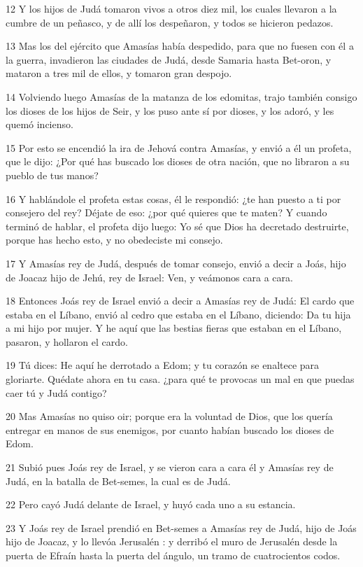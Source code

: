 \par 12 Y los hijos de Judá tomaron vivos a otros diez mil, los cuales llevaron a la cumbre de un peñasco, y de allí los despeñaron, y todos se hicieron pedazos.
\par 13 Mas los del ejército que Amasías había despedido, para que no fuesen con él a la guerra, invadieron las ciudades de Judá, desde Samaria hasta Bet-oron, y mataron a tres mil de ellos, y tomaron gran despojo.
\par 14 Volviendo luego Amasías de la matanza de los edomitas, trajo también consigo los dioses de los hijos de Seir, y los puso ante sí por dioses, y los adoró, y les quemó incienso.
\par 15 Por esto se encendió la ira de Jehová contra Amasías, y envió a él un profeta, que le dijo: ¿Por qué has buscado los dioses de otra nación, que no libraron a su pueblo de tus manos?
\par 16 Y hablándole el profeta estas cosas, él le respondió: ¿te han puesto a ti por consejero del rey? Déjate de eso: ¿por qué quieres que te maten? Y cuando terminó de hablar, el profeta dijo luego: Yo sé que Dios ha decretado destruirte, porque has hecho esto, y no obedeciste mi consejo.
\par 17 Y Amasías rey de Judá, después de tomar consejo, envió a decir a Joás, hijo de Joacaz hijo de Jehú, rey de Israel: Ven, y veámonos cara a cara.
\par 18 Entonces Joás rey de Israel envió a decir a Amasías rey de Judá: El cardo que estaba en el Líbano, envió al cedro que estaba en el Líbano, diciendo: Da tu hija a mi hijo por mujer. Y he aquí que las bestias fieras que estaban en el Líbano, pasaron, y hollaron el cardo.
\par 19 Tú dices: He aquí he derrotado a Edom; y tu corazón se enaltece para gloriarte. Quédate ahora en tu casa. ¿para qué te provocas un mal en que puedas caer tú y Judá contigo?
\par 20 Mas Amasías no quiso oir; porque era la voluntad de Dios, que los quería entregar en manos de sus enemigos, por cuanto habían buscado los dioses de Edom.
\par 21 Subió pues Joás rey de Israel, y se vieron cara a cara él y Amasías rey de Judá, en la batalla de Bet-semes, la cual es de Judá.
\par 22 Pero cayó Judá delante de Israel, y huyó cada uno a su estancia.
\par 23 Y Joás rey de Israel prendió en Bet-semes a Amasías rey de Judá, hijo de Joás hijo de Joacaz, y lo  llevóa Jerusalén : y derribó el muro de Jerusalén  desde la puerta de Efraín hasta la puerta del ángulo, un tramo de cuatrocientos codos.
